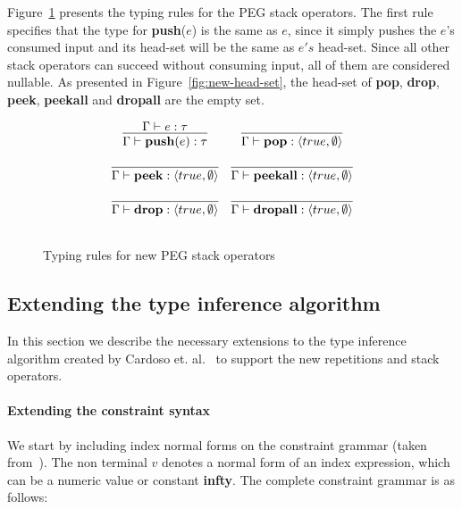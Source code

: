 \documentclass[sigplan,screen]{acmart}
\theoremstyle{definition}
\begin{document}
Figure~\ref{fig:typing-stack} presents the typing rules for the PEG stack
operators. The first rule specifies that the type for \textbf{push}($e$) is
the same as $e$, since it simply pushes the $e$'s consumed input and its
head-set will be the same as $e's$ head-set. Since all other stack operators
can succeed without consuming input, all of them are considered nullable.
As presented in Figure~\ref{fig:new-head-set}, the head-set of \textbf{pop},
\textbf{drop}, \textbf{peek}, \textbf{peekall} and \textbf{dropall} are the
empty set.

\begin{figure}[H]
  \[
    \begin{array}{cc}
      \infer{\Gamma \vdash \mathbf{push}(e) : \tau}
            {\Gamma \vdash e : \tau}
      &
      \infer{\Gamma \vdash \mathbf{pop} : \langle true, \emptyset\rangle}{}  \\ & \\
      \infer{\Gamma \vdash \mathbf{peek} : \langle true, \emptyset\rangle}{} &
      \infer{\Gamma \vdash \mathbf{peekall} : \langle true, \emptyset\rangle}{} \\ & \\
      \infer{\Gamma \vdash \mathbf{drop} : \langle true, \emptyset\rangle}{} &
      \infer{\Gamma \vdash \mathbf{dropall} : \langle true, \emptyset\rangle}{} \\ & \\
    \end{array}
  \]
  \caption{Typing rules for new PEG stack operators}
  \label{fig:typing-stack}
\end{figure}

\subsection{Extending the type inference algorithm}

In this section we describe the necessary extensions to the type inference algorithm
created by Cardoso et. al.~\cite{Cardoso23} to support the new repetitions and
stack operators.

\paragraph{Extending the constraint syntax} We start by including index normal forms
on the constraint grammar (taken from~\cite{Cardoso23}). The non terminal $v$ denotes
a normal form of an index expression, which can be a numeric value or
constant \textbf{infty}. The complete constraint grammar is as follows:
\end{document}
